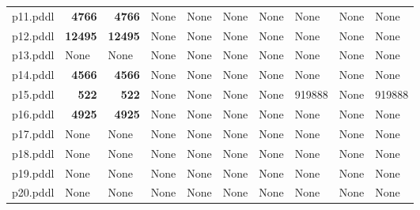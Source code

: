 \documentclass{article}
\begin{document}
\begin{tabular}{@{}lrrrrrrrrr@{}}
p11.pddl & \textbf{4766} & \textbf{4766} & \multicolumn{1}{|l|}{None} & \multicolumn{1}{|l|}{None} & \multicolumn{1}{|l|}{None} & \multicolumn{1}{|l|}{None} & \multicolumn{1}{|l|}{None} & \multicolumn{1}{|l|}{None} & \multicolumn{1}{|l|}{None} \\
p12.pddl & \textbf{12495} & \textbf{12495} & \multicolumn{1}{|l|}{None} & \multicolumn{1}{|l|}{None} & \multicolumn{1}{|l|}{None} & \multicolumn{1}{|l|}{None} & \multicolumn{1}{|l|}{None} & \multicolumn{1}{|l|}{None} & \multicolumn{1}{|l|}{None} \\
p13.pddl & \multicolumn{1}{|l|}{None} & \multicolumn{1}{|l|}{None} & \multicolumn{1}{|l|}{None} & \multicolumn{1}{|l|}{None} & \multicolumn{1}{|l|}{None} & \multicolumn{1}{|l|}{None} & \multicolumn{1}{|l|}{None} & \multicolumn{1}{|l|}{None} & \multicolumn{1}{|l|}{None} \\
p14.pddl & \textbf{4566} & \textbf{4566} & \multicolumn{1}{|l|}{None} & \multicolumn{1}{|l|}{None} & \multicolumn{1}{|l|}{None} & \multicolumn{1}{|l|}{None} & \multicolumn{1}{|l|}{None} & \multicolumn{1}{|l|}{None} & \multicolumn{1}{|l|}{None} \\
p15.pddl & \textbf{522} & \textbf{522} & \multicolumn{1}{|l|}{None} & \multicolumn{1}{|l|}{None} & \multicolumn{1}{|l|}{None} & \multicolumn{1}{|l|}{None} & 919888 & \multicolumn{1}{|l|}{None} & 919888 \\
p16.pddl & \textbf{4925} & \textbf{4925} & \multicolumn{1}{|l|}{None} & \multicolumn{1}{|l|}{None} & \multicolumn{1}{|l|}{None} & \multicolumn{1}{|l|}{None} & \multicolumn{1}{|l|}{None} & \multicolumn{1}{|l|}{None} & \multicolumn{1}{|l|}{None} \\
p17.pddl & \multicolumn{1}{|l|}{None} & \multicolumn{1}{|l|}{None} & \multicolumn{1}{|l|}{None} & \multicolumn{1}{|l|}{None} & \multicolumn{1}{|l|}{None} & \multicolumn{1}{|l|}{None} & \multicolumn{1}{|l|}{None} & \multicolumn{1}{|l|}{None} & \multicolumn{1}{|l|}{None} \\
p18.pddl & \multicolumn{1}{|l|}{None} & \multicolumn{1}{|l|}{None} & \multicolumn{1}{|l|}{None} & \multicolumn{1}{|l|}{None} & \multicolumn{1}{|l|}{None} & \multicolumn{1}{|l|}{None} & \multicolumn{1}{|l|}{None} & \multicolumn{1}{|l|}{None} & \multicolumn{1}{|l|}{None} \\
p19.pddl & \multicolumn{1}{|l|}{None} & \multicolumn{1}{|l|}{None} & \multicolumn{1}{|l|}{None} & \multicolumn{1}{|l|}{None} & \multicolumn{1}{|l|}{None} & \multicolumn{1}{|l|}{None} & \multicolumn{1}{|l|}{None} & \multicolumn{1}{|l|}{None} & \multicolumn{1}{|l|}{None} \\
p20.pddl & \multicolumn{1}{|l|}{None} & \multicolumn{1}{|l|}{None} & \multicolumn{1}{|l|}{None} & \multicolumn{1}{|l|}{None} & \multicolumn{1}{|l|}{None} & \multicolumn{1}{|l|}{None} & \multicolumn{1}{|l|}{None} & \multicolumn{1}{|l|}{None} & \multicolumn{1}{|l|}{None} \\
\end{tabular}
\end{document}
